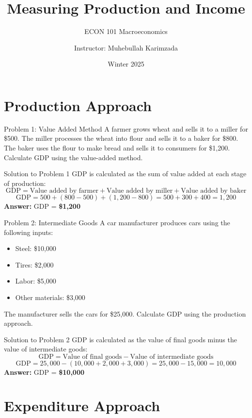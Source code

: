 \documentclass{beamer}
\title{Measuring Production and Income}
\subtitle{ECON 101 Macroeconomics}
\author{Instructor: Muhebullah Karimzada}
\date{Winter 2025}
\begin{document}
\begin{frame}
\titlepage
\end{frame}

\section{Production Approach}

\begin{frame}{Problem 1: Value Added Method}
A farmer grows wheat and sells it to a miller for \$500. The miller processes the wheat into flour and sells it to a baker for \$800. The baker uses the flour to make bread and sells it to consumers for \$1,200. Calculate GDP using the value-added method.
\end{frame}

\begin{frame}{Solution to Problem 1}
GDP is calculated as the sum of value added at each stage of production:
\[
\text{GDP} = \text{Value added by farmer} + \text{Value added by miller} + \text{Value added by baker}
\]
\[
\text{GDP} = 500 + (800 - 500) + (1,200 - 800) = 500 + 300 + 400 = 1,200
\]
\textbf{Answer:} GDP = \textbf{\$1,200}
\end{frame}

\begin{frame}{Problem 2: Intermediate Goods}
A car manufacturer produces cars using the following inputs:
\begin{itemize}
    \item Steel: \$10,000
    \item Tires: \$2,000
    \item Labor: \$5,000
    \item Other materials: \$3,000
\end{itemize}
The manufacturer sells the cars for \$25,000. Calculate GDP using the production approach.
\end{frame}

\begin{frame}{Solution to Problem 2}
GDP is calculated as the value of final goods minus the value of intermediate goods:
\[
\text{GDP} = \text{Value of final goods} - \text{Value of intermediate goods}
\]
\[
\text{GDP} = 25,000 - (10,000 + 2,000 + 3,000) = 25,000 - 15,000 = 10,000
\]
\textbf{Answer:} GDP = \textbf{\$10,000}
\end{frame}

\section{Expenditure Approach}
\end{document}
